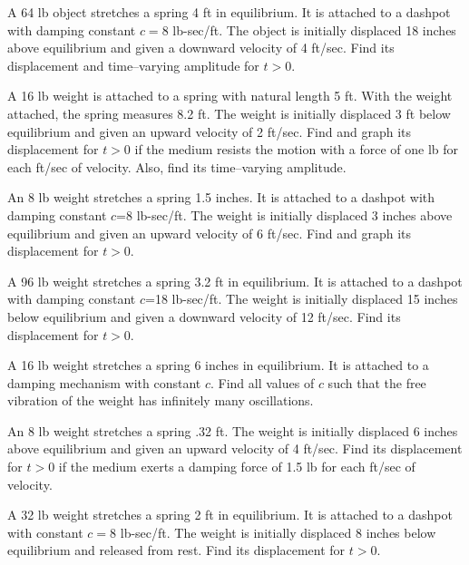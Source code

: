 \exercises
\begin{exerciselist}
  \item\label{exer:6.2.1} A 64 lb object stretches a spring 4 ft in equilibrium. It is attached to a
        dashpot with damping constant $c=8$ lb-sec/ft. The object is initially displaced 18 inches
        above equilibrium and given a downward velocity of 4 ft/sec. Find its displacement and
        time--varying amplitude for $t>0$.

  \item\label{exer:6.2.2} \CGex A 16 lb weight is attached to a spring with natural length 5 ft.
        With the weight attached, the spring measures 8.2 ft. The weight is initially displaced 3 ft
        below equilibrium and given an upward velocity of 2 ft/sec. Find and graph its displacement
        for $t>0$ if the medium resists the motion with a force of one lb for each ft/sec of
        velocity. Also, find its time--varying amplitude.

  \item\label{exer:6.2.3} \CGex An 8 lb weight stretches a spring 1.5 inches. It is attached to a
        dashpot with damping constant $c$=8 lb-sec/ft. The weight is initially displaced 3 inches
        above equilibrium and given an upward velocity of 6 ft/sec. Find and graph its displacement
        for $t>0$.

  \item\label{exer:6.2.4} A 96 lb weight stretches a spring 3.2 ft in equilibrium. It is attached to
        a dashpot with damping constant $c$=18 lb-sec/ft. The weight is initially displaced 15
        inches below equilibrium and given a downward velocity of 12 ft/sec. Find its displacement
        for $t>0$.

  \item\label{exer:6.2.5} A 16 lb weight stretches a spring 6 inches in equilibrium. It is attached
        to a damping mechanism with constant $c$. Find all values of $c$ such that the free
        vibration of the weight has infinitely many oscillations.

  \item\label{exer:6.2.6} An 8 lb weight stretches a spring .32 ft. The weight is initially
        displaced 6 inches above equilibrium and given an upward velocity of 4 ft/sec. Find its
        displacement for $t>0$ if the medium exerts a damping force of 1.5 lb for each ft/sec of
        velocity.

  \item\label{exer:6.2.7} A 32 lb weight stretches a spring 2 ft in equilibrium. It is attached to a
        dashpot with constant $c=8$ lb-sec/ft. The weight is initially displaced 8 inches below
        equilibrium and released from rest. Find its displacement for $t>0$.


\end{exerciselist}
